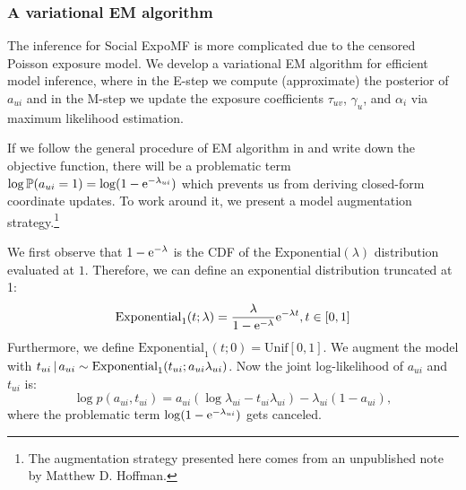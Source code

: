 
\subsubsection{A variational EM algorithm}

The inference for Social ExpoMF is more complicated due to the censored Poisson exposure model. We develop a variational \gls{EM} algorithm for efficient model inference, where in the E-step we compute (approximate) the posterior of $a_{ui}$ and in the M-step we update the exposure coefficients $\tau_{uv}$, $\gamma_u$, and $\alpha_i$ via maximum likelihood estimation.

If we follow the general procedure of \gls{EM} algorithm in  and write down the objective function, there will be a problematic term $\log \mathbb{P}(a_{ui} = 1) = \log (1 - \mathrm{e}^{-\lambda_{ui}})$ which prevents us from deriving closed-form coordinate updates. To work around it, we present a model augmentation strategy.\footnote{The augmentation strategy presented here comes from an unpublished note by Matthew D. Hoffman.}

We first observe that $1 - \mathrm{e}^{-\lambda}$ is the \gls{CDF} of the $\mathrm{Exponential}(\lambda)$ distribution evaluated at $1$. Therefore, we can define an exponential distribution truncated at 1:
\[
\mathrm{Exponential}_1(t; \lambda) = \frac{\lambda}{1 - \mathrm{e}^{-\lambda}} \mathrm{e}^{-\lambda t}, t\in[0, 1]
\]
Furthermore, we define $\mathrm{Exponential}_1(t; 0) = \mathrm{Unif}[0, 1]$. We augment the model with 
 $t_{ui} \,\vert\, a_{ui} \sim \mathrm{Exponential}_1(t_{ui}; a_{ui}\lambda_{ui})$. Now the joint log-likelihood of $a_{ui}$ and $t_{ui}$ is:
\[
\log p(a_{ui}, t_{ui}) = a_{ui} (\log \lambda_{ui} - t_{ui} \lambda_{ui}) - \lambda_{ui}(1 - a_{ui}),
\]
where the problematic term $\log (1 - \mathrm{e}^{-\lambda_{ui}})$ gets canceled.


